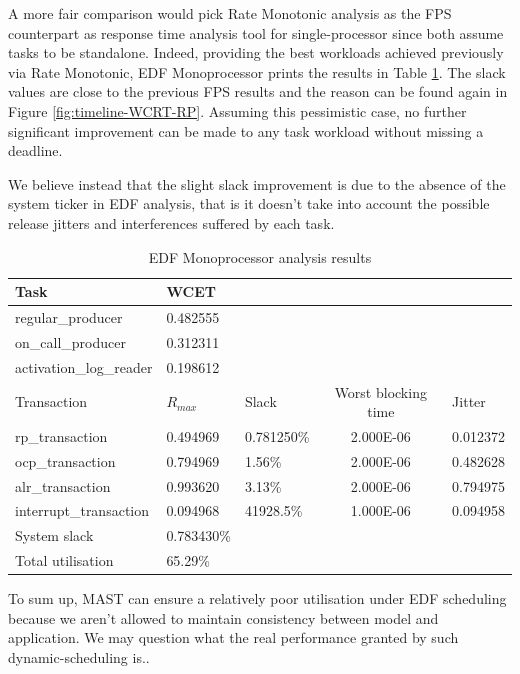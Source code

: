 \documentclass{article}
\begin{document}
A more fair comparison would pick Rate Monotonic analysis as the FPS counterpart as response time analysis tool for single-processor since both assume tasks to be standalone. Indeed, providing the best workloads achieved previously via Rate Monotonic, EDF Monoprocessor prints the results in Table \ref{tab:EDF-mono-rate-mono}. The slack values are close to the previous FPS results and the reason can be found again in Figure \ref{fig:timeline-WCRT-RP}. Assuming this pessimistic case, no further significant improvement can be made to any task workload without missing a deadline.

We believe instead that the slight slack improvement is due to the absence of the system ticker in EDF analysis, that is it doesn't take into account the possible release jitters and interferences suffered by each task.

\begin{table}[!htbp]
   \centering
   \begin{tabular}{lllcl}
    \toprule
    Task & WCET \\
    \midrule
    regular\_producer & 0.482555     \\
    on\_call\_producer & 0.312311     \\
    activation\_log\_reader & 0.198612 \\
    \toprule
    \toprule
    Transaction & $R_{max}$ & Slack & Worst blocking time & Jitter \\
    \midrule
    rp\_transaction        & 0.494969  & 0.781250\% & 2.000E-06  & 0.012372 \\
    ocp\_transaction       & 0.794969  & 1.56\%     & 2.000E-06  & 0.482628  \\
    alr\_transaction       & 0.993620  & 3.13\%     & 2.000E-06  & 0.794975   \\
    interrupt\_transaction & 0.094968  & 41928.5\%  & 1.000E-06  & 0.094958    \\
    \toprule
    \toprule
    System slack & 0.783430\% \\
    Total utilisation & 65.29\% \\
   \end{tabular}
   \caption{EDF Monoprocessor analysis results}
   \label{tab:EDF-mono-rate-mono}
 \end{table}

To sum up, MAST can ensure a relatively poor utilisation under EDF scheduling because we aren't allowed to maintain consistency between model and application.
We may question what the real performance granted by such dynamic-scheduling is..
\end{document}
